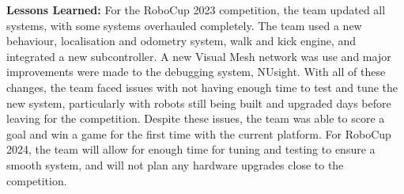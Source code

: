 \documentclass{llncs}
\begin{document}

\noindent\textbf{Lessons Learned:} For the RoboCup 2023 competition, the team updated all systems, with some systems overhauled completely. The team used a new behaviour, localisation and odometry system, walk and kick engine, and integrated a new subcontroller. A new Visual Mesh network was use and major improvements were made to the debugging system, NUsight. With all of these changes, the team faced issues with not having enough time to test and tune the new system, particularly with robots still being built and upgraded days before leaving for the competition. Despite these issues, the team was able to score a goal and win a game for the first time with the current platform. For RoboCup 2024, the team will allow for enough time for tuning and testing to ensure a smooth system, and will not plan any hardware upgrades close to the competition. \newline
\end{document}
